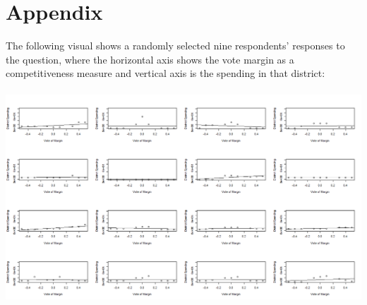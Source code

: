 \documentclass{article}
\begin{document}
\section{Appendix} 
The following visual shows a randomly selected nine respondents' responses to the question, where the horizontal axis shows the vote margin as a competitiveness measure and vertical axis is the spending in that district:\\
\\
\includegraphics[width=180mm]{Respondents_1}
\\

\end{document}

